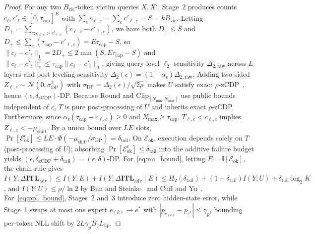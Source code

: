 \documentclass[10pt,journal,compsoc]{IEEEtran}
\theoremstyle{definition}
\theoremstyle{remark}
\begin{document}
\begin{proof}
For any two $B_{\mathrm{vic}}$-token victim queries $X, X'$, Stage~2 produces counts $c_\ell, c'_\ell \in [0, \tau_{\mathrm{cap}}]^E$ with $\sum_e c_{\ell,e} = \sum_e c'_{\ell,e} = S = k B_{\mathrm{vic}}$. Letting $D_+ = \sum_{e: c_{\ell,e} > c'_{\ell,e}}(c_{\ell,e} - c'_{\ell,e})$, we have both $D_+ \le S$ and $D_+ \le \sum_e(\tau_{\mathrm{cap}} - c'_{\ell,e}) = E\tau_{\mathrm{cap}} - S$, so $\|c_\ell - c'_\ell\|_1 = 2 D_+ \le 2\min(S, E\tau_{\mathrm{cap}} - S)$ and $\|c_\ell - c'_\ell\|_2^2 \le \tau_{\mathrm{cap}}\|c_\ell - c'_\ell\|_1$, giving query-level $\ell_2$ sensitivity $\Delta_{2,\mathrm{raw}}$ across $L$ layers and post-leveling sensitivity $\Delta_2(\epsilon) = (1 - \alpha_\epsilon)\Delta_{2,\mathrm{raw}}$. Adding two-sided $Z_{\ell,e} \sim \mathcal{N}(0, \sigma_{\mathrm{DP}}^2)$ with $\sigma_{\mathrm{DP}} = \Delta_2(\epsilon)/\sqrt{2\rho}$ makes $U$ satisfy exact $\rho$-zCDP~\cite{bun2016zcdp}, hence $(\epsilon, \delta_{\mathrm{zCDP}})$-DP. Because $\mathrm{Round}$ and $\mathrm{Clip}_{[N_{\min}, N_{\max}]}$ use public bounds independent of $c$, $T$ is pure post-processing of $U$ and inherits exact $\rho$-zCDP. Furthermore, since $\alpha_\epsilon(\tau_{\mathrm{cap}} - c_{\ell,e}) \ge 0$ and $N_{\max} \ge \tau_{\mathrm{cap}}$, $T_{\ell,e} < c_{\ell,e}$ implies $Z_{\ell,e} < -\mu_{\mathrm{shift}}$. By a union bound over $LE$ slots, $\Pr[\mathcal{E}_{\mathrm{ok}}^c] \le LE \cdot \Phi(-\mu_{\mathrm{shift}}/\sigma_{\mathrm{DP}}) = \delta_{\mathrm{tail}}$. On $\mathcal{E}_{\mathrm{ok}}$, execution depends solely on $T$ (post-processing of $U$); absorbing $\Pr[\mathcal{E}_{\mathrm{ok}}^c] \le \delta_{\mathrm{tail}}$ into the additive failure budget yields $(\epsilon, \delta_{\mathrm{zCDP}} + \delta_{\mathrm{tail}}) = (\epsilon, \delta)$-DP. For~\eqref{eq:mi_bound}, letting $E = \mathbb{I}[\mathcal{E}_{\mathrm{ok}}]$, the chain rule gives $I(Y; \Delta\mathbf{ITL}_{\mathrm{adv}}) \le I(Y; E) + I(Y; \Delta\mathbf{ITL}_{\mathrm{adv}} \mid E) \le H_2(\delta_{\mathrm{tail}}) + (1-\delta_{\mathrm{tail}}) I(Y; U) + \delta_{\mathrm{tail}}\log_2 K$, and $I(Y; U) \le \rho/\ln 2$ by Bun and Steinke~\cite{bun2016zcdp} and Cuff and Yu~\cite{cuff2016dpmi}. For~\eqref{eq:ppl_bound}, Stages~2 and~3 introduce zero hidden-state error, while Stage~1 swaps at most one expert $e_{(k)} \to e^*$ with $|p_{e_{(k)}} - p_{e^*}| \le \gamma_p$, bounding per-token NLL shift by $2 L \gamma_p B_f L_{\mathrm{lip}}$.
\end{proof}

\end{document}
